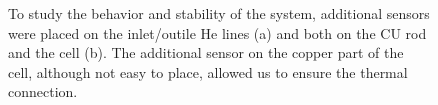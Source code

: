 \begin{refsection}
        \begin{figure}[]   
            \centering
            \hfill
            \caption[CEX 2023: additional \lakeshore sensors]{To study the behavior and stability of the system, additional \lakeshore sensors were placed on the inlet/outile He lines (a) and both on the CU rod and the cell (b). The additional sensor on the copper part of the cell, although not easy to place, allowed us to ensure the thermal connection.}
            \label{fig:CEX:2023:sensors}
        \end{figure}
    

\end{refsection}
